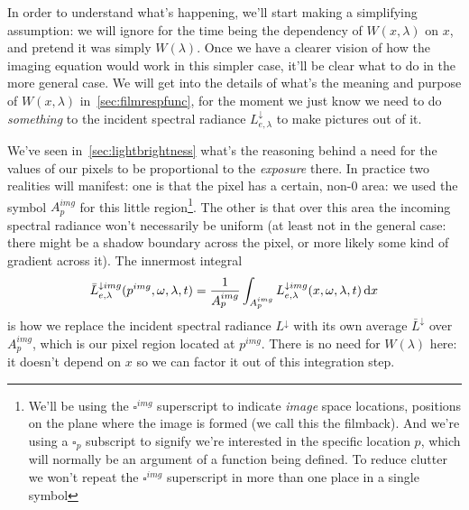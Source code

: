 In order to understand what's happening, we'll start making a simplifying assumption:
we will ignore for the time being the dependency of $W(x,\lambda)$ on $x$, and 
pretend it was simply $W(\lambda)$. 
Once we have a clearer vision of how the imaging equation would work in this
simpler case, it'll be clear what to do in the more general case. 
We will get into the details of what's the meaning and purpose of $W(x,\lambda)$ 
in~\cref{sec:filmrespfunc}, for the moment we just know we need to do 
\emph{something} to the incident \gls{spectral} \gls{radiance} $L^{\downarrow}_{e,\lambda}$ to make
pictures out of it.

We've seen in~\cref{sec:lightbrightness} what's the reasoning behind a need for the values 
of our pixels to be proportional to the \textsl{ \gls{exposure}} there. 
In practice two realities will manifest: one is that the pixel has a certain, 
non-$0$ area: we used the symbol $A^{img}_p$ for this little region\footnote{
	We'll be using the $\square^{img}$ superscript to indicate \textsl{\gls{image}} space 
	locations, positions on the plane where the image is formed (we call this 
	the \gls{filmback}). And we're using a $\square_p$ subscript to signify we're 
	interested in the specific location $p$, which will normally be an argument of a 
	function being defined. To reduce clutter we won't repeat the $\square^{img}$ 
	superscript in more than one place in a single symbol}. 
The other is that over this area the incoming \gls{spectral} 
\gls{radiance} won't necessarily be uniform (at least not in the general case: 
there might be a shadow boundary across the pixel, or more likely some kind of 
gradient across it). 
The innermost integral
\begin{displaymath}
	\bar L^{\downarrow img}_{e,\lambda}(p^{img}, \omega, \lambda, t) = \frac1{A_p^{img}} \int_{A_p^{img}} L^{\downarrow img}_{e,\lambda}(x, \omega, \lambda, t) \mathop{}\!\mathrm{d} x
\end{displaymath}
is how we replace the incident \gls{spectral} \gls{radiance} $L^{\downarrow}$ with 
its own average $\bar L^{\downarrow}$ over $A^{img}_p$, which is our pixel region located at $p^{img}$. 
There is no need for $W(\lambda)$ here: it doesn't depend on $x$ so we can factor it 
out of this integration step.

